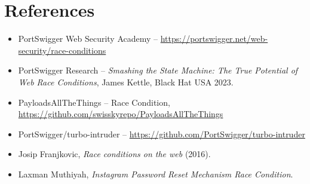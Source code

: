 \documentclass[11pt]{article}
\begin{document}
\section{References}
\begin{itemize}[leftmargin=1.2em]
  \item PortSwigger Web Security Academy -- \url{https://portswigger.net/web-security/race-conditions}
  \item PortSwigger Research -- \textit{Smashing the State Machine: The True Potential of Web Race Conditions}, James Kettle, Black Hat USA 2023.
  \item PayloadsAllTheThings -- Race Condition, \url{https://github.com/swisskyrepo/PayloadsAllTheThings}
  \item PortSwigger/turbo-intruder -- \url{https://github.com/PortSwigger/turbo-intruder}
  \item Josip Franjkovic, \textit{Race conditions on the web} (2016).
  \item Laxman Muthiyah, \textit{Instagram Password Reset Mechanism Race Condition}.
\end{itemize}
\end{document}
